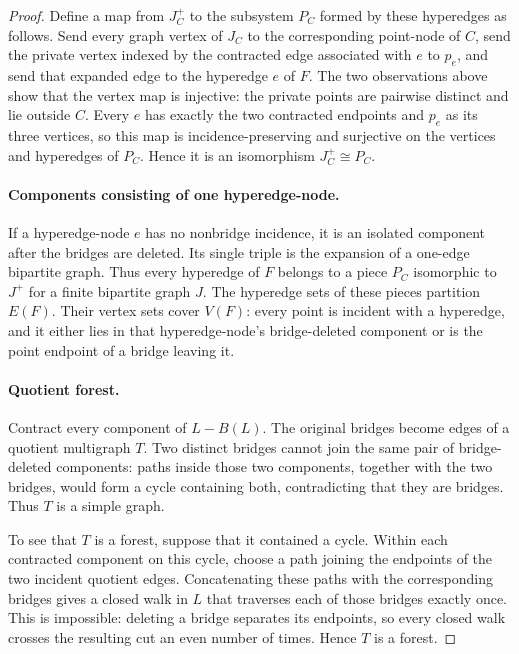 \documentclass[a4paper,11pt,reqno]{amsart}
\theoremstyle{plain}
\theoremstyle{definition}
\theoremstyle{remark}
\begin{document}
\begin{proof}
Define a map from \(J_C^+\) to the subsystem \(P_C\) formed by these
hyperedges as follows. Send every graph vertex of \(J_C\) to the
corresponding point-node of \(C\), send the private vertex indexed by the
contracted edge associated with \(e\) to \(p_e\), and send that expanded edge
to the hyperedge \(e\) of \(F\). The two observations above show that the
vertex map is injective: the private points are pairwise distinct and lie
outside \(C\). Every \(e\) has exactly the two contracted endpoints and
\(p_e\) as its three vertices, so this map is incidence-preserving and
surjective on the vertices and hyperedges of \(P_C\). Hence it is an
isomorphism \(J_C^+\cong P_C\).

\paragraph{Components consisting of one hyperedge-node.}\label{components-consisting-of-one-hyperedge-node}

If a hyperedge-node \(e\) has no nonbridge incidence, it is an isolated component after the bridges are deleted. Its single triple is the expansion of a one-edge bipartite graph. Thus every hyperedge of \(F\) belongs to a piece \(P_C\) isomorphic to \(J^+\) for a finite bipartite graph \(J\). The hyperedge sets of these pieces partition \(E(F)\). Their vertex sets cover \(V(F)\): every point is incident with a hyperedge, and it either lies in that hyperedge-node's bridge-deleted component or is the point endpoint of a bridge leaving it.

\paragraph{Quotient forest.}\label{quotient-forest}

Contract every component of \(L-B(L)\). The original bridges become edges of a quotient multigraph \(T\). Two distinct bridges cannot join the same pair of bridge-deleted components: paths inside those two components, together with the two bridges, would form a cycle containing both, contradicting that they are bridges. Thus \(T\) is a simple graph.

To see that \(T\) is a forest, suppose that it contained a cycle. Within
each contracted component on this cycle, choose a path joining the
endpoints of the two incident quotient edges. Concatenating these paths
with the corresponding bridges gives a closed walk in \(L\) that traverses
each of those bridges exactly once. This is impossible: deleting a bridge
separates its endpoints, so every closed walk crosses the resulting cut an
even number of times. Hence \(T\) is a forest.


\end{proof}
\end{document}
